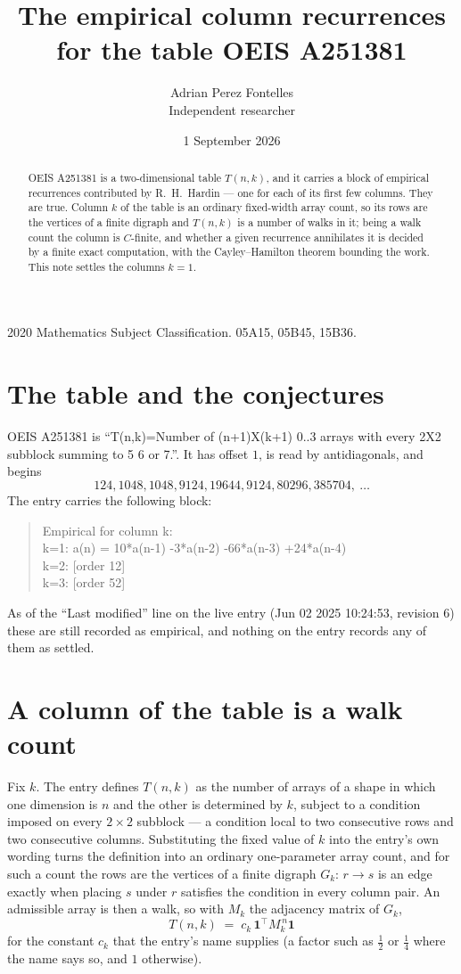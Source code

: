 \documentclass[11pt,a4paper]{article}
\title{The empirical column recurrences for the table OEIS A251381}
\author{Adrian Perez Fontelles\\ \small Independent researcher}
\date{1 September 2026}
\theoremstyle{plain}
\theoremstyle{definition}
\begin{document}
\maketitle

\begin{abstract}
OEIS A251381 is a two-dimensional table $T(n,k)$, and it carries a block of empirical
recurrences contributed by R.~H.~Hardin --- one for each of its first few columns. They are
true. Column $k$ of the table is an ordinary fixed-width array count, so its rows are the
vertices of a finite digraph and $T(n,k)$ is a number of walks in it; being a walk count the
column is $C$-finite, and whether a given recurrence annihilates it is decided by a finite
exact computation, with the Cayley--Hamilton theorem bounding the work. This note settles the columns $k=1$.
\end{abstract}

\noindent\small 2020 Mathematics Subject Classification. 05A15, 05B45, 15B36.\normalsize

\section{The table and the conjectures}

OEIS A251381 is ``T(n,k)=Number of (n+1)X(k+1) 0..3 arrays with every 2X2 subblock summing to 5 6 or 7.''. It has offset $1$, is
read by antidiagonals, and begins
\[
124, 1048, 1048, 9124, 19644, 9124, 80296, 385704,\ \dots
\]
The entry carries the following block:
\begin{quote}\small
Empirical for column k:\\
k=1: a(n) = 10*a(n-1) -3*a(n-2) -66*a(n-3) +24*a(n-4)\\
k=2: [order 12]\\
k=3: [order 52]\\
\end{quote}
As of the ``Last modified'' line on the live entry (Jun 02 2025 10:24:53, revision 6) these are still
recorded as empirical, and nothing on the entry records any of them as settled.

\section{A column of the table is a walk count}

Fix $k$. The entry defines $T(n,k)$ as the number of arrays of a shape in which one dimension
is $n$ and the other is determined by $k$, subject to a condition imposed on every
$2\times2$ subblock --- a condition local to two consecutive rows and two consecutive columns.
Substituting the fixed value of $k$ into the entry's own wording turns the definition into an
ordinary one-parameter array count, and for such a count the rows are the vertices of a finite
digraph $G_k$: $r\to s$ is an edge exactly when placing $s$ under $r$ satisfies the condition
in every column pair. An admissible array is then a walk, so with $M_k$ the adjacency matrix
of $G_k$,
\[
T(n,k)\;=\;c_k\,\mathbf{1}^{\!\top}M_k^{\,n}\mathbf{1}
\]
for the constant $c_k$ that the entry's name supplies (a factor such as $\tfrac12$ or
$\tfrac14$ where the name says so, and $1$ otherwise).
\end{document}
